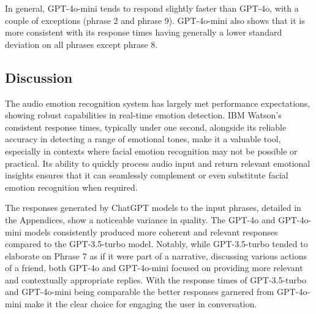 In general, GPT-4o-mini tends to respond slightly faster than GPT-4o, with a couple of exceptions (phrase 2 and phrase 9). GPT-4o-mini also shows that it is more consistent with its response times having generally a lower standard deviation on all phrases except phrase 8.

\subsection{Discussion}

The audio emotion recognition system has largely met performance expectations, showing robust capabilities in real-time emotion detection. IBM Watson's consistent response times, typically under one second, alongside its reliable accuracy in detecting a range of emotional tones, make it a valuable tool, especially in contexts where facial emotion recognition may not be possible or practical. Its ability to quickly process audio input and return relevant emotional insights ensures that it can seamlessly complement or even substitute facial emotion recognition when required.

The responses generated by ChatGPT models to the input phrases, detailed in the Appendices, show a noticeable variance in quality. The GPT-4o and GPT-4o-mini models consistently produced more coherent and relevant responses compared to the GPT-3.5-turbo model. Notably, while GPT-3.5-turbo tended to elaborate on Phrase 7 as if it were part of a narrative, discussing various actions of a friend, both GPT-4o and GPT-4o-mini focused on providing more relevant and contextually appropriate replies. With the response times of GPT-3.5-turbo and GPT-4o-mini being comparable the better responses garnered from GPT-4o-mini make it the clear choice for engaging the user in conversation.